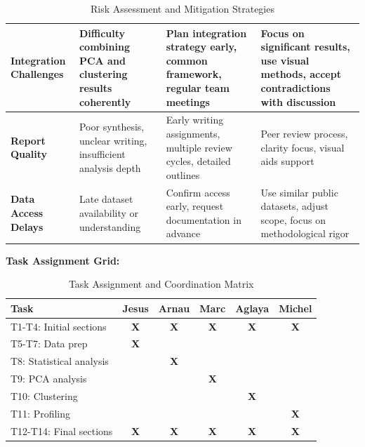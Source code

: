 \documentclass[12pt,a4paper]{article}
\begin{document}
\begin{table}[H]
\begin{tabular}{|p{2.8cm}|p{3.2cm}|p{3.8cm}|p{3.8cm}|}
\hline
\textbf{Integration Challenges} & Difficulty combining PCA and clustering results coherently & Plan integration strategy early, common framework, regular team meetings & Focus on significant results, use visual methods, accept contradictions with discussion \\
\hline
\textbf{Report Quality} & Poor synthesis, unclear writing, insufficient analysis depth & Early writing assignments, multiple review cycles, detailed outlines & Peer review process, clarity focus, visual aids support \\
\hline
\textbf{Data Access Delays} & Late dataset availability or understanding & Confirm access early, request documentation in advance & Use similar public datasets, adjust scope, focus on methodological rigor \\
\hline
\end{tabular}
\caption{{Risk Assessment and Mitigation Strategies}}
\label{tab:risks}
\end{table}

\textbf{\textcolor{secondaryblue}{Task Assignment Grid:}}

\begin{table}[H]
\centering
\footnotesize
\renewcommand{\arraystretch}{1.2}
\begin{tabular}{|p{3cm}|c|c|c|c|c|}
\hline
\rowcolor{primaryblue!10}
\textbf{\textcolor{primaryblue}{Task}} & \textbf{\textcolor{primaryblue}{Jesus}} & \textbf{\textcolor{primaryblue}{Arnau}} & \textbf{\textcolor{primaryblue}{Marc}} & \textbf{\textcolor{primaryblue}{Aglaya}} & \textbf{\textcolor{primaryblue}{Michel}} \\
\hline
T1-T4: Initial sections & \textcolor{primaryblue}{\textbf{X}} & \textcolor{primaryblue}{\textbf{X}} & \textcolor{primaryblue}{\textbf{X}} & \textcolor{primaryblue}{\textbf{X}} & \textcolor{primaryblue}{\textbf{X}} \\
\hline
\rowcolor{lightgray!10}
T5-T7: Data prep & \textcolor{primaryblue}{\textbf{X}} & & & & \\
\hline
T8: Statistical analysis & & \textcolor{primaryblue}{\textbf{X}} & & & \\
\hline
\rowcolor{lightgray!10}
T9: PCA analysis & & & \textcolor{primaryblue}{\textbf{X}} & & \\
\hline
T10: Clustering & & & & \textcolor{primaryblue}{\textbf{X}} & \\
\hline
\rowcolor{lightgray!10}
T11: Profiling & & & & & \textcolor{primaryblue}{\textbf{X}} \\
\hline
T12-T14: Final sections & \textcolor{primaryblue}{\textbf{X}} & \textcolor{primaryblue}{\textbf{X}} & \textcolor{primaryblue}{\textbf{X}} & \textcolor{primaryblue}{\textbf{X}} & \textcolor{primaryblue}{\textbf{X}} \\
\hline
\end{tabular}
\caption{\textcolor{primaryblue}{Task Assignment and Coordination Matrix}}
\label{tab:assignments}
\end{table}
\end{document}
